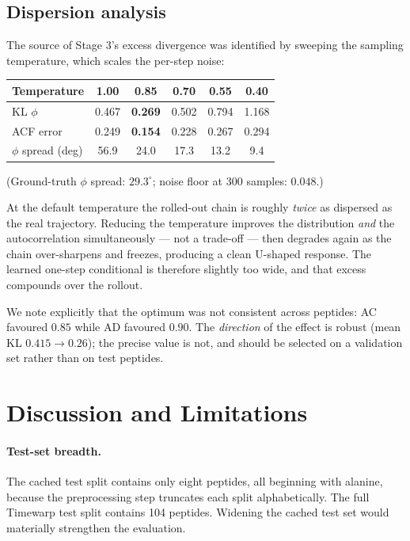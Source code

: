 \documentclass[11pt,a4paper]{article}
\begin{document}
\subsection{Dispersion analysis}
\label{sec:dispersion}
The source of Stage 3's excess divergence was identified by sweeping the
sampling temperature, which scales the per-step noise:

\begin{center}
\begin{tabular}{@{}lccccc@{}}
\toprule
Temperature & 1.00 & 0.85 & 0.70 & 0.55 & 0.40 \\
\midrule
KL $\phi$          & 0.467 & \textbf{0.269} & 0.502 & 0.794 & 1.168 \\
ACF error          & 0.249 & \textbf{0.154} & 0.228 & 0.267 & 0.294 \\
$\phi$ spread (deg)& 56.9  & 24.0  & 17.3  & 13.2  & 9.4 \\
\bottomrule
\end{tabular}
\end{center}

\noindent(Ground-truth $\phi$ spread: $29.3^\circ$; noise floor at 300 samples:
$0.048$.)

At the default temperature the rolled-out chain is roughly \emph{twice} as
dispersed as the real trajectory. Reducing the temperature improves the
distribution \emph{and} the autocorrelation simultaneously --- not a trade-off
--- then degrades again as the chain over-sharpens and freezes, producing a
clean U-shaped response. The learned one-step conditional is therefore slightly
too wide, and that excess compounds over the rollout.

We note explicitly that the optimum was not consistent across peptides: AC
favoured $0.85$ while AD favoured $0.90$. The \emph{direction} of the effect is
robust (mean KL $0.415 \to 0.26$); the precise value is not, and should be
selected on a validation set rather than on test peptides.

\section{Discussion and Limitations}
\label{sec:limits}

\paragraph{Test-set breadth.} The cached test split contains only eight
peptides, all beginning with alanine, because the preprocessing step truncates
each split alphabetically. The full Timewarp test split contains 104 peptides.
Widening the cached test set would materially strengthen the evaluation.
\end{document}
